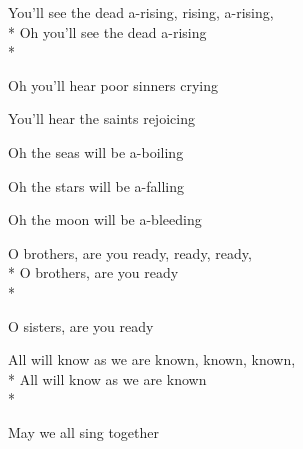 
\contd
{}

\versemark
You’ll see the dead a-rising, rising, a-rising,\\*
Oh you’ll see the dead a-rising\\*
\vin{}



\versemark
Oh you’ll hear poor sinners crying\simile

\versemark
You’ll hear the saints rejoicing\simile

\versemark
Oh the seas will be a-boiling\simile

\versemark
Oh the stars will be a-falling\simile

\versemark
Oh the moon will be a-bleeding\simile

\versemark
O brothers, are you ready, ready, ready,\\*
O brothers, are you ready\\*
\vin{}

\versemark
O sisters, are you ready\simile

\versemark
All will know as we are known, known, known,\\*
All will know as we are known\\*
\vin{}

\versemark
May we all sing together\simile

